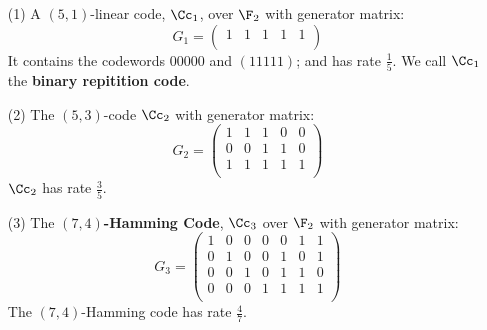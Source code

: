 \begin{example}\cite{mceliece}
    \begin{enumerate}
        \item[(1)] A $(5,1)$-linear code, $\Cc_1$, over $\F_2$ with generator
            matrix:
            \begin{equation*}
                G_1=\begin{pmatrix}
                        1   &   1    &   1   &   1   &   1   \\
                    \end{pmatrix}
            \end{equation*}
            It contains the codewords $00000$ and $(11111)$; and has rate
            $\frac{1}{5}$. We call $\Cc_1$ the \textbf{binary repitition code}.

        \item[(2)] The $(5,3)$-code $\Cc_2$ with generator matrix:
            \begin{equation*}
                G_2=\begin{pmatrix}
                        1   &   1   &   1   &   0   &   0   \\
                        0   &   0   &   1   &   1   &   0   \\
                        1   &   1   &   1   &   1   &   1   \\
                    \end{pmatrix}
            \end{equation*}
            $\Cc_2$ has rate $\frac{3}{5}$.

        \item[(3)] The \textbf{$(7,4)$-Hamming Code}, $\Cc_3$ over $\F_2$ with
            generator matrix:
            \begin{equation*}
                G_3=\begin{pmatrix}
                        1   &   0   &   0   &   0   &   0   &   1   &   1   \\
                        0   &   1   &   0   &   0   &   1   &   0   &   1   \\
                        0   &   0   &   1   &   0   &   1   &   1   &   0   \\
                        0   &   0   &   0   &   1   &   1   &   1   &   1   \\
                    \end{pmatrix}
            \end{equation*}
            The $(7,4)$-Hamming code has rate $\frac{4}{7}$.
    \end{enumerate}
\end{example}

